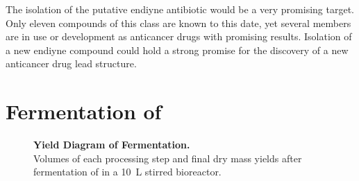 The isolation of the putative endiyne antibiotic would be a very promising target.
Only eleven compounds of this class are known to this date, yet several members are in use or development as anticancer drugs with promising results.\autocite{Liang2010,Galm2005}
Isolation of a new endiyne compound could  hold a strong promise for the discovery of a new anticancer drug lead structure.



\section{Fermentation of \tue{}} %
\label{sec:fermentation_of_tue}

\begin{figure}[htbp]
\centering

\caption[Yield Diagram of \tue{} Fermentation]{%
	\textbf{Yield Diagram of \tue{} Fermentation.}\\
	Volumes of each processing step and final dry mass yields after fermentation of \tue{} in a \SI{10}{\liter} stirred bioreactor.}
\end{figure}

